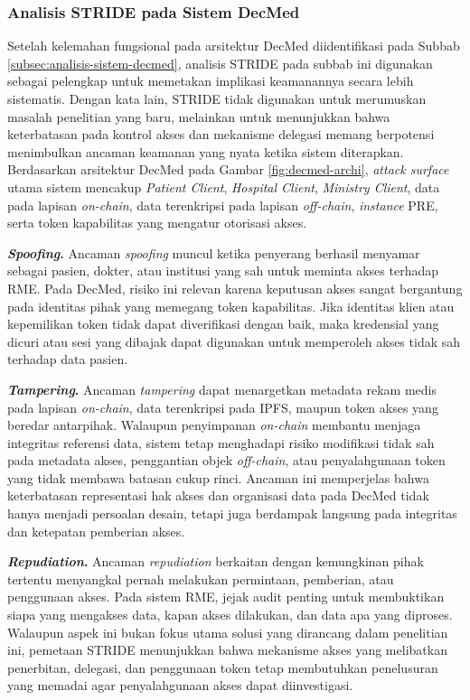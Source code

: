 \subsubsection{Analisis STRIDE pada Sistem DecMed}
\label{subsec:analisis-stride-decmed}
Setelah kelemahan fungsional pada arsitektur DecMed diidentifikasi pada Subbab \ref{subsec:analisis-sistem-decmed}, analisis STRIDE pada subbab ini digunakan sebagai pelengkap untuk memetakan implikasi keamanannya secara lebih sistematis. Dengan kata lain, STRIDE tidak digunakan untuk merumuskan masalah penelitian yang baru, melainkan untuk menunjukkan bahwa keterbatasan pada kontrol akses dan mekanisme delegasi memang berpotensi menimbulkan ancaman keamanan yang nyata ketika sistem diterapkan. Berdasarkan arsitektur DecMed pada Gambar \ref{fig:decmed-archi}, \textit{attack surface} utama sistem mencakup \textit{Patient Client}, \textit{Hospital Client}, \textit{Ministry Client}, data pada lapisan \textit{on-chain}, data terenkripsi pada lapisan \textit{off-chain}, \textit{instance} PRE, serta token kapabilitas yang mengatur otorisasi akses.

\textbf{\textit{Spoofing}.} Ancaman \textit{spoofing} muncul ketika penyerang berhasil menyamar sebagai pasien, dokter, atau institusi yang sah untuk meminta akses terhadap RME. Pada DecMed, risiko ini relevan karena keputusan akses sangat bergantung pada identitas pihak yang memegang token kapabilitas. Jika identitas klien atau kepemilikan token tidak dapat diverifikasi dengan baik, maka kredensial yang dicuri atau sesi yang dibajak dapat digunakan untuk memperoleh akses tidak sah terhadap data pasien.

\textbf{\textit{Tampering}.} Ancaman \textit{tampering} dapat menargetkan metadata rekam medis pada lapisan \textit{on-chain}, data terenkripsi pada IPFS, maupun token akses yang beredar antarpihak. Walaupun penyimpanan \textit{on-chain} membantu menjaga integritas referensi data, sistem tetap menghadapi risiko modifikasi tidak sah pada metadata akses, penggantian objek \textit{off-chain}, atau penyalahgunaan token yang tidak membawa batasan cukup rinci. Ancaman ini memperjelas bahwa keterbatasan representasi hak akses dan organisasi data pada DecMed tidak hanya menjadi persoalan desain, tetapi juga berdampak langsung pada integritas dan ketepatan pemberian akses.

\textbf{\textit{Repudiation}.} Ancaman \textit{repudiation} berkaitan dengan kemungkinan pihak tertentu menyangkal pernah melakukan permintaan, pemberian, atau penggunaan akses. Pada sistem RME, jejak audit penting untuk membuktikan siapa yang mengakses data, kapan akses dilakukan, dan data apa yang diproses. Walaupun aspek ini bukan fokus utama solusi yang dirancang dalam penelitian ini, pemetaan STRIDE menunjukkan bahwa mekanisme akses yang melibatkan penerbitan, delegasi, dan penggunaan token tetap membutuhkan penelusuran yang memadai agar penyalahgunaan akses dapat diinvestigasi.

